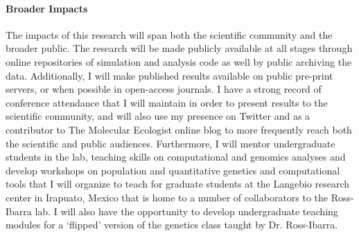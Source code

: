 \paragraph{Broader Impacts}

The impacts of this research will span both the scientific community and the broader public. The research will be made publicly available at all stages through online repositories of simulation and analysis code as well by public archiving the data. Additionally, I will make published results available on public pre-print servers, or when possible in open-access journals. I have a strong record of conference attendance that I will maintain in order to present results to the scientific community, and will also use my presence on Twitter and as a contributor to The Molecular Ecologist online blog to more frequently reach both the scientific and public audiences. Furthermore, I will mentor undergraduate students in the lab, teaching skills on computational and genomics analyses and develop workshops on population and quantitative genetics and computational tools that I will organize to teach for graduate students at the Langebio research center in Irapuato, Mexico that is home to a number of collaborators to the Ross-Ibarra lab.  I will also have the opportunity to develop undergraduate teaching modules for a `flipped' version of the genetics class taught by Dr. Ross-Ibarra.







